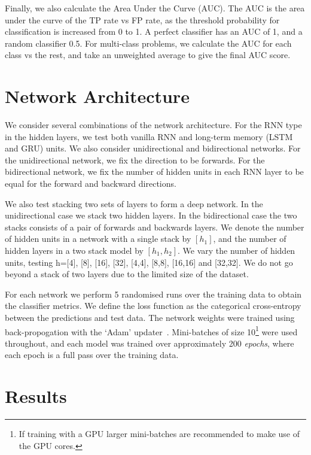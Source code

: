\documentclass[nofootinbib,amsmath,amssymb,10pt,eqsecnum, twocolumn]{revtex4-1}
\begin{document}
Finally, we also calculate  the Area Under the Curve (AUC). The AUC is the area under the curve of the TP rate vs FP rate, as the threshold probability for classification is increased from 0 to 1. A perfect classifier has an AUC of 1, and a random classifier 0.5. For multi-class problems, we calculate the AUC for each class vs the rest, and take an unweighted average to give the final AUC score. 

\section{Network Architecture}

We consider several combinations of the network architecture. For the RNN type in the hidden layers, we test both vanilla RNN and long-term memory (LSTM and GRU) units. We also consider unidirectional  and bidirectional networks. For the unidirectional network, we fix the direction to be forwards. For the bidirectional network, we fix the number of hidden units in each RNN layer to be equal for the forward and backward directions. 

We also test stacking two sets of layers to form a deep network.  In the unidirectional case we stack two hidden layers. In the bidirectional case the two stacks consists  of a pair  of forwards and backwards layers.  We denote the number of hidden units in a network with a  single stack by $[h_1]$, and the number of hidden layers in a two stack model by $[h_1, h_2]$. We vary the number of hidden units, testing h=[4], [8], [16], [32], [4,4], [8,8], [16,16] and [32,32]. We do not go beyond a stack of two layers due to the limited size of the dataset. 

For each network we perform 5 randomised runs over the training data to obtain the classifier metrics. We define the loss function as the categorical cross-entropy between the predictions and test data. The network weights were trained using back-propogation with the `Adam' updater~\cite{2014arXiv1412.6980K}. Mini-batches of size 10\footnote{If training with a GPU larger mini-batches are recommended to make use of the GPU cores.} were used throughout, and each model was trained over approximately 200 {\em epochs}, where each epoch is a full pass over the training data.

\section{Results}
\end{document}
